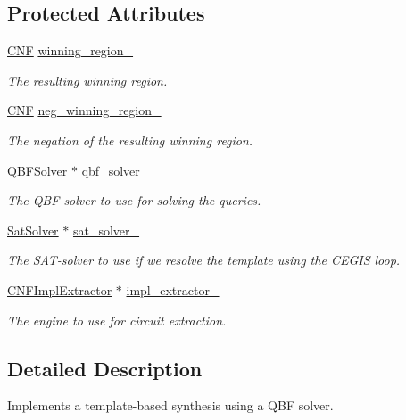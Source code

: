 \subsection*{Protected Attributes}
\begin{DoxyCompactItemize}
\item 
\hyperlink{classCNF}{C\-N\-F} \hyperlink{classTemplateSynth_a4e147629eae6a542dd87d72902df68c8}{winning\-\_\-region\-\_\-}
\begin{DoxyCompactList}\small\item\em The resulting winning region. \end{DoxyCompactList}\item 
\hyperlink{classCNF}{C\-N\-F} \hyperlink{classTemplateSynth_a49665461c82781b823b3da04057fdab2}{neg\-\_\-winning\-\_\-region\-\_\-}
\begin{DoxyCompactList}\small\item\em The negation of the resulting winning region. \end{DoxyCompactList}\item 
\hyperlink{classQBFSolver}{Q\-B\-F\-Solver} $\ast$ \hyperlink{classTemplateSynth_a08ec20197bf16a10546a7e6cf3719727}{qbf\-\_\-solver\-\_\-}
\begin{DoxyCompactList}\small\item\em The Q\-B\-F-\/solver to use for solving the queries. \end{DoxyCompactList}\item 
\hyperlink{classSatSolver}{Sat\-Solver} $\ast$ \hyperlink{classTemplateSynth_a7844e9296d63b10e3fa96d66b932660f}{sat\-\_\-solver\-\_\-}
\begin{DoxyCompactList}\small\item\em The S\-A\-T-\/solver to use if we resolve the template using the C\-E\-G\-I\-S loop. \end{DoxyCompactList}\item 
\hyperlink{classCNFImplExtractor}{C\-N\-F\-Impl\-Extractor} $\ast$ \hyperlink{classTemplateSynth_acfa25deb001fb3b6d49c0261bba98347}{impl\-\_\-extractor\-\_\-}
\begin{DoxyCompactList}\small\item\em The engine to use for circuit extraction. \end{DoxyCompactList}\end{DoxyCompactItemize}


\subsection{Detailed Description}
Implements a template-\/based synthesis using a Q\-B\-F solver. 

